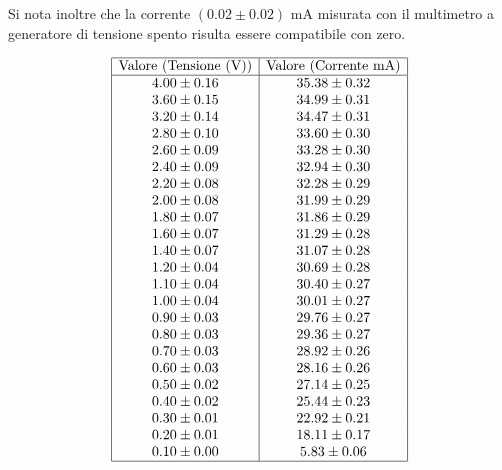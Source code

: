 \documentclass[a4paper,11pt]{article}
\begin{document}
Si nota inoltre che la corrente $(0.02 \pm 0.02)$ $ \mathrm{mA}$ misurata con il multimetro a generatore di tensione spento risulta essere compatibile con zero.



\medskip

\printbibliography



\[
\begin{array}{|c|c|}
\hline
\text{Valore (Tensione (V))} & \text{Valore (Corrente mA)} \\ \hline
4.00 \pm 0.16 & 35.38 \pm 0.32 \\ 
3.60 \pm 0.15 & 34.99 \pm 0.31 \\ 
3.20 \pm 0.14 & 34.47 \pm 0.31 \\ 
2.80 \pm 0.10 & 33.60 \pm 0.30 \\ 
2.60 \pm 0.09 & 33.28 \pm 0.30 \\ 
2.40 \pm 0.09 & 32.94 \pm 0.30 \\ 
2.20 \pm 0.08 & 32.28 \pm 0.29 \\ 
2.00 \pm 0.08 & 31.99 \pm 0.29 \\ 
1.80 \pm 0.07 & 31.86 \pm 0.29 \\ 
1.60 \pm 0.07 & 31.29 \pm 0.28 \\ 
1.40 \pm 0.07 & 31.07 \pm 0.28 \\ 
1.20 \pm 0.04 & 30.69 \pm 0.28 \\ 
1.10 \pm 0.04 & 30.40 \pm 0.27 \\ 
1.00 \pm 0.04 & 30.01 \pm 0.27 \\ 
0.90 \pm 0.03 & 29.76 \pm 0.27 \\ 
0.80 \pm 0.03 & 29.36 \pm 0.27 \\ 
0.70 \pm 0.03 & 28.92 \pm 0.26 \\ 
0.60 \pm 0.03 & 28.16 \pm 0.26 \\ 
0.50 \pm 0.02 & 27.14 \pm 0.25 \\ 
0.40 \pm 0.02 & 25.44 \pm 0.23 \\ 
0.30 \pm 0.01 & 22.92 \pm 0.21 \\ 
0.20 \pm 0.01 & 18.11 \pm 0.17 \\ 
0.10 \pm 0.00 & 5.83 \pm 0.06 \\ \hline
\end{array}
\]
\end{document}
